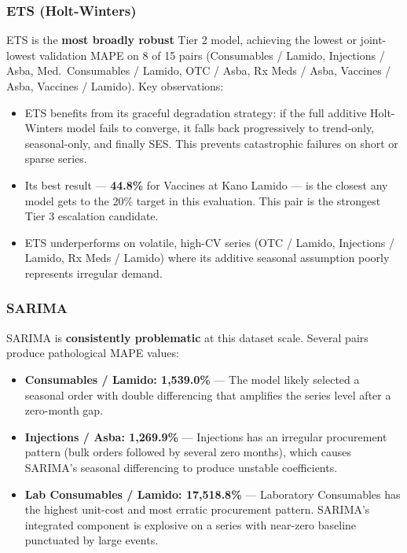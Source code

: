 \documentclass[12pt, a4paper]{article}
\begin{document}
\subsubsection{ETS (Holt-Winters)}

ETS is the \textbf{most broadly robust} Tier 2 model, achieving the
lowest or joint-lowest validation MAPE on 8 of 15 pairs (Consumables /
Lamido, Injections / Asba, Med.\ Consumables / Lamido, OTC / Asba, Rx
Meds / Asba, Vaccines / Asba, Vaccines / Lamido). Key observations:

\begin{itemize}[leftmargin=1.5em, itemsep=3pt]
  \item ETS benefits from its graceful degradation strategy: if the full
        additive Holt-Winters model fails to converge, it falls back
        progressively to trend-only, seasonal-only, and finally SES.
        This prevents catastrophic failures on short or sparse series.
  \item Its best result --- \textbf{44.8\%} for Vaccines at Kano Lamido
        --- is the closest any model gets to the 20\% target in this
        evaluation. This pair is the strongest Tier 3 escalation candidate.
  \item ETS underperforms on volatile, high-CV series (OTC / Lamido,
        Injections / Lamido, Rx Meds / Lamido) where its additive
        seasonal assumption poorly represents irregular demand.
\end{itemize}

\subsubsection{SARIMA}

SARIMA is \textbf{consistently problematic} at this dataset scale. Several
pairs produce pathological MAPE values:

\begin{itemize}[leftmargin=1.5em, itemsep=3pt]
  \item \textbf{Consumables / Lamido: 1,539.0\%} --- The model likely
        selected a seasonal order with double differencing that amplifies
        the series level after a zero-month gap.
  \item \textbf{Injections / Asba: 1,269.9\%} --- Injections has an
        irregular procurement pattern (bulk orders followed by several
        zero months), which causes SARIMA's seasonal differencing to
        produce unstable coefficients.
  \item \textbf{Lab Consumables / Lamido: 17,518.8\%} --- Laboratory
        Consumables has the highest unit-cost and most erratic procurement
        pattern. SARIMA's integrated component is explosive on a series
        with near-zero baseline punctuated by large events.
\end{itemize}
\end{document}
